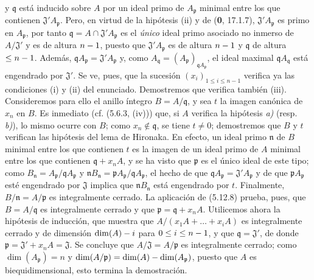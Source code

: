 
y $\mathfrak q$ está inducido sobre $A$ por un ideal primo de
$A_{\mathfrak p}$ minimal entre los que contienen
$\mathfrak J'A_{\mathfrak p}$. Pero, en virtud de la hipótesis (ii) y de (\textbf 0,
17.1.7), $\mathfrak J'A_{\mathfrak p}$ es primo en $A_{\mathfrak p}$, por
tanto
$\mathfrak q=A\cap\mathfrak J'A_{\mathfrak p}$
es el \emph{único} ideal primo asociado no inmerso de $A/\mathfrak J'$ y es de
altura $n- 1$, puesto que $\mathfrak J'A_{\mathfrak p}$ es de altura $n- 1$ y
$\mathfrak q$ de altura $\leq n- 1$. Además,
$\mathfrak qA_{\mathfrak p}=\mathfrak J'A_{\mathfrak p}$ y, como
$A_{\mathfrak q}=(A_{\mathfrak p})_{\mathfrak qA_{\mathfrak p}}$, el ideal
maximal $\mathfrak qA_{\mathfrak q}$ está engendrado por $\mathfrak J'$. Se
ve, pues, que la sucesión $(x_i)_{1\leq i\leq n-1}$ verifica ya las
condiciones (i) y (ii) del enunciado. Demostremos que verifica también (iii).
Consideremos para ello el anillo íntegro $B=A/\mathfrak q$, y sea $t$ la
imagen canónica de $x_n$ en $B$. Es inmediato (cf. (5.6.3, (iv))) que, si $A$
verifica la hipótesis \emph{a)} (resp. \emph{b)}), lo mismo ocurre con $B$; como
$x_n\notin\mathfrak q$, se tiene $t\neq0$; demostremos que $B$ y $t$ verifican
las hipótesis del lema de Hironaka. En efecto, un ideal primo $\mathfrak n$ de
$B$ minimal entre los que contienen $t$ es la imagen de un ideal primo de $A$
minimal entre los que contienen $\mathfrak q+x_nA$, y se ha visto que
$\mathfrak p$ es el único ideal de este tipo; como
$B_{\mathfrak n}=A_{\mathfrak p}/\mathfrak qA_{\mathfrak p}$ y
$\mathfrak nB_{\mathfrak n}
=\mathfrak pA_{\mathfrak p}/\mathfrak qA_{\mathfrak p}$,
el hecho de que $\mathfrak qA_{\mathfrak p}=\mathfrak J'A_{\mathfrak p}$ y
de que $\mathfrak pA_{\mathfrak p}$ esté engendrado por $\mathfrak J$
implica que $\mathfrak nB_{\mathfrak n}$ está engendrado por $t$. Finalmente,
$B/\mathfrak n=A/\mathfrak p$ es integralmente cerrado. La aplicación de
(5.12.8) prueba, pues, que $B=A/\mathfrak q$ es integralmente cerrado y que
$\mathfrak p=\mathfrak q+x_nA$. Utilicemos ahora la hipótesis de inducción,
que muestra que $A/(x_1A+\ldots+x_iA)$ es integralmente cerrado y de dimensión
$\dim(A)- i$ para $0\leq i\leq n- 1$, y que $\mathfrak q=\mathfrak J'$, de
donde $\mathfrak p=\mathfrak J'+x_nA=\mathfrak J$. Se concluye que
$A/\mathfrak J=A/\mathfrak p$ es integralmente cerrado; como
$\dim(A_{\mathfrak p})=n$ y
$\dim(A/\mathfrak p)=\dim(A)-\dim(A_{\mathfrak p})$, puesto que $A$ es
biequidimensional, esto termina la demostración.
